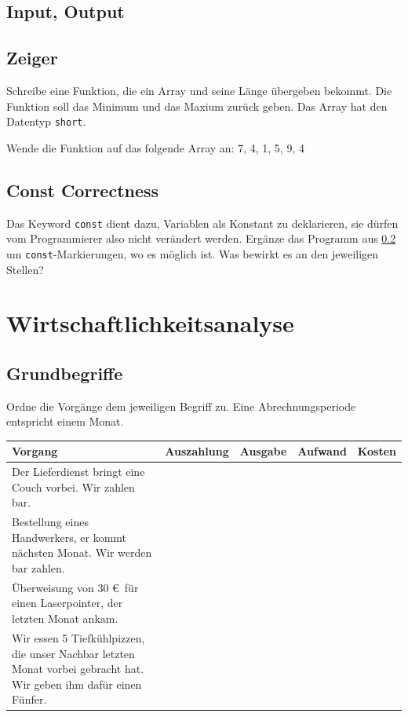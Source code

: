 \documentclass[11pt, a4paper]{article}
\begin{document}
\subsection{Input, Output}

\subsection{Zeiger}
\label{zeigerAufgabe}
Schreibe eine Funktion, die ein Array und seine Länge übergeben bekommt. Die Funktion soll das Minimum und das Maxium zurück geben. Das Array hat den Datentyp \texttt{short}.

Wende die Funktion auf das folgende Array an:
7, 4, 1, 5, 9, 4

\subsection{Const Correctness}
Das Keyword \texttt{const} dient dazu, Variablen als Konstant zu deklarieren, sie dürfen vom Programmierer also nicht verändert werden. Ergänze das Programm aus \ref{zeigerAufgabe} um \texttt{const}-Markierungen, wo es möglich ist. Was bewirkt es an den jeweiligen Stellen?

\newpage
\section{Wirtschaftlichkeitsanalyse}
\subsection{Grundbegriffe}
Ordne die Vorgänge dem jeweiligen Begriff zu. Eine Abrechnungsperiode entspricht einem Monat.

\begin{tabularx}{\columnwidth}{X|c|c|c|c}
	Vorgang & Auszahlung & Ausgabe & Aufwand & Kosten \\ \hline
	Der Lieferdienst bringt eine Couch vorbei. Wir zahlen bar. &   &   &  &  \\ \hline
	Bestellung eines Handwerkers, er kommt nächsten Monat. Wir werden bar zahlen. &  &  &  &  \\ \hline
	Überweisung von 30 \euro \ für einen Laserpointer, der letzten Monat ankam. &   &  &  & \\ \hline
	Wir essen 5 Tiefkühlpizzen, die unser Nachbar letzten Monat vorbei gebracht hat. Wir geben ihm dafür einen Fünfer. &   &  &   &  
\end{tabularx}
\end{document}
